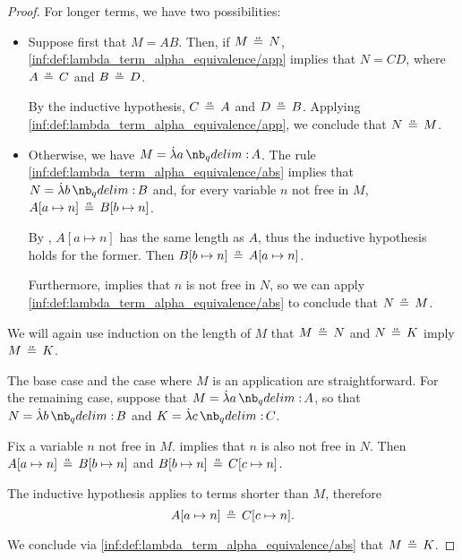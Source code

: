 \begin{proof}
  For longer terms, we have two possibilities:
  \begin{itemize}
    \item Suppose first that \( M = AB \). Then, if \( M \aequiv N \), \ref{inf:def:lambda_term_alpha_equivalence/app} implies that \( N = CD \), where \( A \aequiv C \) and \( B \aequiv D \).

    By the inductive hypothesis, \( C \aequiv A \) and \( D \aequiv B \). Applying \ref{inf:def:lambda_term_alpha_equivalence/app}, we conclude that \( N \aequiv M \).

    \item Otherwise, we have \( M = \qabs a A \). The rule \ref{inf:def:lambda_term_alpha_equivalence/abs} implies that \( N = \qabs b B \) and, for every variable \( n \) not free in \( M \), \( A[a \mapsto n] \aequiv B[b \mapsto n] \).

    By , \( A[a \mapsto n] \) has the same length as \( A \), thus the inductive hypothesis holds for the former. Then \( B[b \mapsto n] \aequiv A[a \mapsto n] \).

    Furthermore,  implies that \( n \) is not free in \( N \), so we can apply \ref{inf:def:lambda_term_alpha_equivalence/abs} to conclude that \( N \aequiv M \).
  \end{itemize}

   We will again use induction on the length of \( M \) that \( M \aequiv N \) and \( N \aequiv K \) imply \( M \aequiv K \).

  The base case and the case where \( M \) is an application are straightforward. For the remaining case, suppose that \( M = \qabs a A \), so that \( N = \qabs b B \) and \( K = \qabs c C \).

  Fix a variable \( n \) not free in \( M \).  implies that \( n \) is also not free in \( N \). Then \( A[a \mapsto n] \aequiv B[b \mapsto n] \) and \( B[b \mapsto n] \aequiv C[c \mapsto n] \).

  The inductive hypothesis applies to terms shorter than \( M \), therefore
  \begin{equation*}
    A[a \mapsto n] \aequiv C[c \mapsto n].
  \end{equation*}

  We conclude via \ref{inf:def:lambda_term_alpha_equivalence/abs} that \( M \aequiv K \).
\end{proof}

